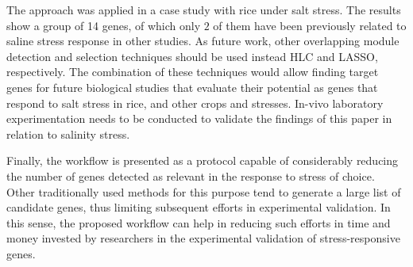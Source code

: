 The approach was applied in a case study with rice under salt
stress. The results show a group of 14 genes, of which only $2$ of
them have been previously related to saline stress response in other
studies. As future work, other overlapping module detection and
selection techniques should be used instead HLC and LASSO,
respectively. The combination of these techniques would allow finding
target genes for future biological studies that evaluate their
potential as genes that respond to salt stress in rice, and other
crops and stresses. In-vivo laboratory experimentation needs to be
conducted to validate the findings of this paper in relation to
salinity stress.
\vspace{0.5cm}

Finally, the workflow is presented as a protocol capable of
considerably reducing the number of genes detected as relevant in the
response to stress of choice. Other traditionally used methods for
this purpose tend to generate a large list of candidate genes, thus
limiting subsequent efforts in experimental validation. In this sense,
the proposed workflow can help in reducing such efforts in time and
money invested by researchers in the experimental validation of
stress-responsive genes.
